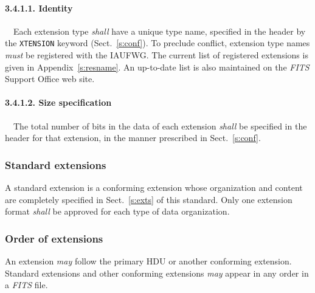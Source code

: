 \documentclass[onecolumn]{aa}
\begin{document}
   \paragraph{3.4.1.1. Identity}
   \label{s:idy}
   \ \newline \ \newline Each extension
   type 
   {\em shall} have a unique type name, 
   specified in the
   header by the {\tt XTENSION} keyword (Sect.\ \ref{s:conf}).
   To preclude conflict, extension type names {\em must} be 
   registered
   with the IAUFWG\@.  The current list of
   registered extensions is given in Appendix~\ref{s:resname}.
   An up-to-date list is also maintained on the {\em FITS\/} 
   Support Office web site.
  
   \paragraph{3.4.1.2. Size specification}
   \ \newline \ \newline The total number of bits in the data of each extension
   {\em shall} be specified in the header for that extension, in the
   manner prescribed in Sect.\ \ref{s:conf}.
  
   \subsubsection{Standard extensions}
   A standard 
   extension is a 
   conforming
   extension whose
   organization and content are completely specified in  
   Sect.\ \ref{s:exts} of this standard.
   Only one extension format
   {\em shall} be approved for each type of data organization.  
  
   \subsubsection{Order of extensions}
   An extension {\em may} follow the primary HDU  
   or another conforming
   extension. 
   Standard 
   extensions 
   and other conforming extensions {\em may} appear 
   in any order
   in a {\em FITS\/} file.
  
\end{document}
